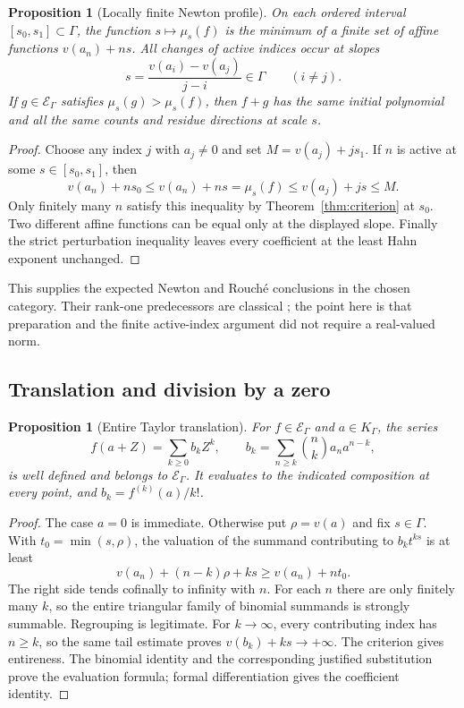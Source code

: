\documentclass[11pt,letterpaper]{article}
\numberwithin{equation}{section}
\newtheorem{proposition}[theorem]{Proposition}
\theoremstyle{definition}
\theoremstyle{remark}
\begin{document}
\begin{proposition}[Locally finite Newton profile]\label{prop:newton}
On each ordered interval $[s_0,s_1]\subset\Gamma$, the function
$s\mapsto\mu_s(f)$ is the minimum of a \emph{finite} set of affine functions
$v(a_n)+ns$. All changes of active indices occur at slopes
\[
 s=\frac{v(a_i)-v(a_j)}{j-i}\in\Gamma\qquad(i\ne j).
\]
If $g\in\mathcal E_\Gamma$ satisfies $\mu_s(g)>\mu_s(f)$, then $f+g$ has the
same initial polynomial and all the same counts and residue directions at
scale $s$.
\end{proposition}
\begin{proof}
Choose any index $j$ with $a_j\ne0$ and set $M=v(a_j)+js_1$. If $n$ is
active at some $s\in[s_0,s_1]$, then
\[
 v(a_n)+ns_0\le v(a_n)+ns=\mu_s(f)\le v(a_j)+js\le M.
\]
Only finitely many $n$ satisfy this inequality by
Theorem~\ref{thm:criterion} at $s_0$. Two different affine functions can
be equal only at the displayed slope. Finally the strict perturbation
inequality leaves every coefficient at the least Hahn exponent unchanged.
\end{proof}

This supplies the expected Newton and Rouch\'e conclusions in the chosen
category. Their rank-one predecessors are classical \cite{CherryLectures};
the point here is that preparation and the finite active-index argument did
not require a real-valued norm.

\subsection{Translation and division by a zero}
\begin{proposition}[Entire Taylor translation]\label{prop:translation}
For $f\in\mathcal E_\Gamma$ and $a\in K_\Gamma$, the series
\begin{equation}\label{eq:translation}
 f(a+Z)=\sum_{k\ge0}b_kZ^k,\qquad
 b_k=\sum_{n\ge k}\binom nk a_n a^{n-k},
\end{equation}
is well defined and belongs to $\mathcal E_\Gamma$. It evaluates to the
indicated composition at every point, and
$b_k=f^{(k)}(a)/k!$.
\end{proposition}
\begin{proof}
The case $a=0$ is immediate. Otherwise put $\rho=v(a)$ and fix $s\in\Gamma$.
With $t_0=\min(s,\rho)$, the valuation of the summand contributing to
$b_kt^{ks}$ is at least
\[
 v(a_n)+(n-k)\rho+ks\ge v(a_n)+nt_0.
\]
The right side tends cofinally to infinity with $n$. For each $n$ there are
only finitely many $k$, so the entire triangular family of binomial summands
is strongly summable. Regrouping is legitimate. For $k\to\infty$, every
contributing index has $n\ge k$, so the same tail estimate proves
$v(b_k)+ks\to+\infty$. The criterion gives entireness. The binomial identity
and the corresponding justified substitution prove the evaluation formula;
formal differentiation gives the coefficient identity.
\end{proof}
\end{document}
